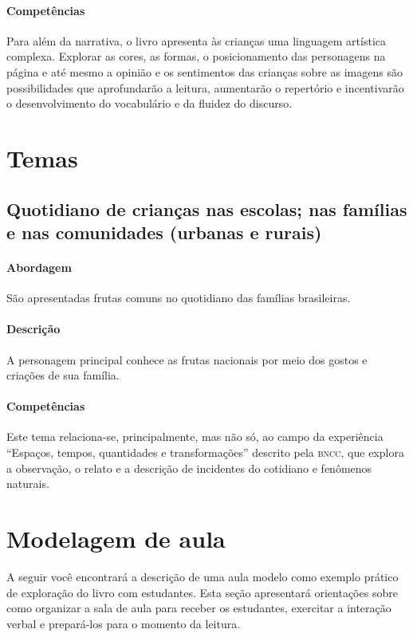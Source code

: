 \documentclass[11pt]{extarticle}
\begin{document}

\paragraph{Competências} 
Para além da narrativa, o livro apresenta às crianças uma linguagem artística complexa.
Explorar as cores, as formas, o posicionamento das personagens 
na página e até mesmo a opinião e os sentimentos das crianças sobre as imagens 
são possibilidades que aprofundarão a leitura, aumentarão o repertório 
e incentivarão o desenvolvimento do vocabulário e da fluidez do discurso. 

\section{Temas}

\subsection{Quotidiano de crianças nas escolas; nas famílias e nas comunidades (urbanas e rurais)}

\paragraph{Abordagem} 
São apresentadas frutas comuns no quotidiano das famílias brasileiras.
\paragraph{Descrição} 
A personagem principal conhece as frutas nacionais
por meio dos gostos e criações de sua família. 
\paragraph{Competências} 
Este tema relaciona-se, principalmente, mas não só, 
ao campo da experiência ``Espaços, tempos, quantidades e transformações''
descrito pela \textsc{bncc}, que explora a observação, o relato e a descrição 
de incidentes do cotidiano e fenômenos naturais.

\section{Modelagem de aula}
A seguir você encontrará a descrição de uma aula modelo como exemplo 
prático de exploração do livro com estudantes. Esta seção apresentará 
orientações sobre como organizar a sala de aula para receber os 
estudantes, exercitar a interação verbal e prepará-los para o 
momento da leitura.
\end{document}
